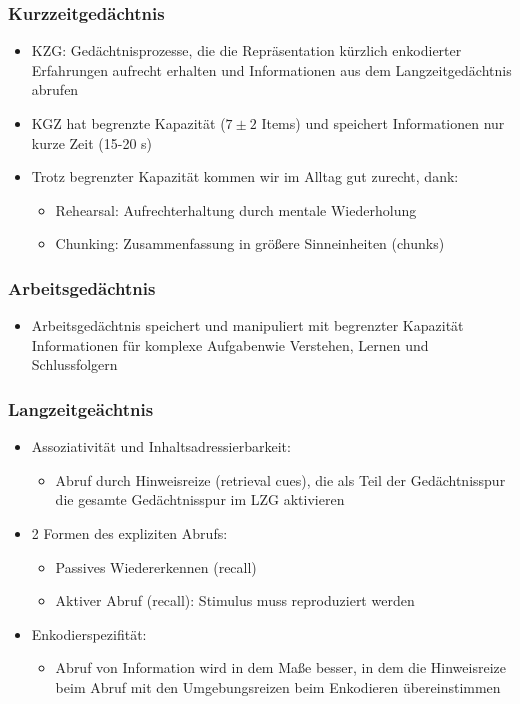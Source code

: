 \subsubsection{Kurzzeitgedächtnis}
\begin{itemize}
	\item KZG: Gedächtnisprozesse, die die Repräsentation kürzlich enkodierter Erfahrungen aufrecht erhalten und Informationen aus dem Langzeitgedächtnis abrufen
	\item KGZ hat begrenzte Kapazität ($7\pm2$ Items) und speichert Informationen nur kurze Zeit (15-20 s)
	\item Trotz begrenzter Kapazität kommen wir im Alltag gut zurecht, dank:
		\begin{itemize}
			\item Rehearsal: Aufrechterhaltung durch mentale Wiederholung
			\item Chunking: Zusammenfassung in größere Sinneinheiten (chunks)
		\end{itemize}
\end{itemize}
\subsubsection{Arbeitsgedächtnis}
\begin{itemize}
	\item Arbeitsgedächtnis speichert und manipuliert mit begrenzter Kapazität Informationen für komplexe Aufgabenwie Verstehen, Lernen und Schlussfolgern
\end{itemize}
\subsubsection{Langzeitgeächtnis}
\begin{itemize}
	\item Assoziativität und Inhaltsadressierbarkeit:
		\begin{itemize}
			\item Abruf durch Hinweisreize (retrieval cues), die als Teil der Gedächtnisspur die gesamte Gedächtnisspur im LZG aktivieren
		\end{itemize}
	\item 2 Formen des expliziten Abrufs:
		\begin{itemize}
			\item Passives Wiedererkennen (recall)
			\item Aktiver Abruf (recall): Stimulus muss reproduziert werden
		\end{itemize}
	\item Enkodierspezifität:
		\begin{itemize}
			\item Abruf von Information wird in dem Maße besser, in dem die Hinweisreize beim Abruf mit den Umgebungsreizen beim Enkodieren übereinstimmen
		\end{itemize}
\end{itemize}
